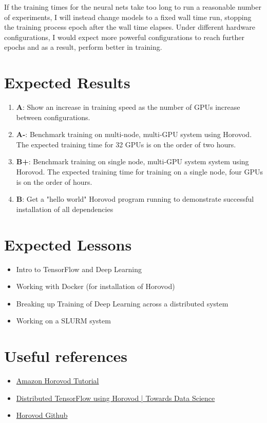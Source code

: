 \documentclass[11pt, oneside]{article}   	%
\begin{document}
If the training times for the neural nets take too long to run a reasonable number of experiments, I will instead change models to a fixed wall time run, stopping the training process 
epoch after the wall time elapses. Under different hardware configurations, I would expect more powerful configurations to reach further epochs and as a result, perform better
in training. 

\section{Expected Results}
\begin{enumerate}
\item \textbf{A}: Show an increase in training speed as the number of GPUs increase between configurations. 
\item \textbf{A-}: Benchmark training on multi-node, multi-GPU system using Horovod. The expected training time for 32 GPUs is on the order of two hours.
\item \textbf{B+}: Benchmark training on single node, multi-GPU system system using Horovod. The expected training time for training on a single node, four GPUs is on the order of hours. 
\item \textbf{B}: Get a "hello world" Horovod program running to demonstrate successful installation of all dependencies
\end{enumerate}

\section{Expected Lessons}
\begin{itemize}
\item Intro to TensorFlow and Deep Learning
\item Working with Docker (for installation of Horovod)
\item Breaking up Training of Deep Learning across a distributed system
\item Working on a SLURM system

\end{itemize}

\section{Useful references}

\begin{itemize}
\item \href{https://docs.aws.amazon.com/dlami/latest/devguide/tutorial-horovod-tensorflow.html}{Amazon Horovod Tutorial}

\item \href{https://towardsdatascience.com/distributed-tensorflow-using-horovod-6d572f8790c4}{Distributed TensorFlow using Horovod | Towards Data Science}

\item \href{https://github.com/horovod/horovod}{Horovod Github}
\end{itemize}
\end{document}
